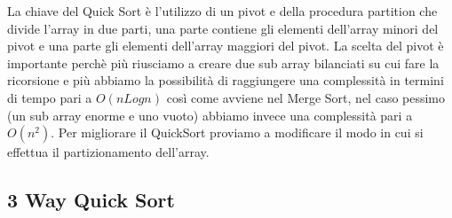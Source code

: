 \documentclass[14pt]{extreport}
\begin{document}
La chiave del Quick Sort è l'utilizzo di un pivot e della procedura partition che divide l'array in due parti, una parte contiene gli elementi dell'array minori del pivot e una parte gli elementi dell'array maggiori del pivot.
La scelta del pivot è importante perchè più riusciamo a creare due sub array bilanciati su cui fare la ricorsione e più abbiamo la possibilità di raggiungere una complessità in termini di tempo pari a $O(nLogn)$ così come avviene nel Merge Sort, nel caso pessimo (un sub array enorme e uno vuoto) abbiamo invece una complessità pari a $O(n^2)$.
Per migliorare il QuickSort proviamo a modificare il modo in cui si effettua il partizionamento dell'array.

\subsection{3 Way Quick Sort}
\end{document}
